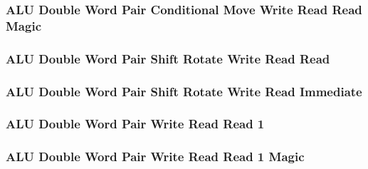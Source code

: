 

\subsubsection[{\small ALU Double Word Pair Conditional Move Write Read Read Magic}]{ALU Double Word Pair Conditional Move Write Read Read Magic} \label{sec:format-ALU-DPCMWRR.M}



\subsubsection[{\small ALU Double Word Pair Shift Rotate Write Read Read}]{ALU Double Word Pair Shift Rotate Write Read Read} \label{sec:format-ALU-DPSWRR}



\subsubsection[{\small ALU Double Word Pair Shift Rotate Write Read Immediate}]{ALU Double Word Pair Shift Rotate Write Read Immediate} \label{sec:format-ALU-DPSWRI}



\subsubsection[{\small ALU Double Word Pair Write Read Read 1}]{ALU Double Word Pair Write Read Read 1} \label{sec:format-ALU-DPWRR1}



\subsubsection[{\small ALU Double Word Pair Write Read Read 1 Magic}]{ALU Double Word Pair Write Read Read 1 Magic} \label{sec:format-ALU-DPWRR1.M}

